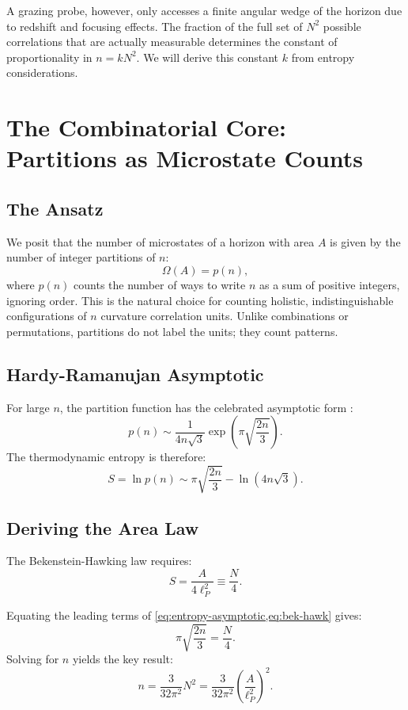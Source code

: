 \documentclass[12pt, letterpaper]{article}
\begin{document}
A grazing probe, however, only accesses a finite angular wedge of the horizon due to redshift and focusing effects. The fraction of the full set of $N^2$ possible correlations that are actually measurable determines the constant of proportionality in $n = k N^2$. We will derive this constant $k$ from entropy considerations.

\section{The Combinatorial Core: Partitions as Microstate Counts}
\label{sec:combinatorics}

\subsection{The Ansatz}
We posit that the number of microstates of a horizon with area $A$ is given by the number of integer partitions of $n$:
\[
\Omega(A) = p(n),
\]
where $p(n)$ counts the number of ways to write $n$ as a sum of positive integers, ignoring order. This is the natural choice for counting holistic, indistinguishable configurations of $n$ curvature correlation units. Unlike combinations or permutations, partitions do not label the units; they count patterns.

\subsection{Hardy-Ramanujan Asymptotic}
For large $n$, the partition function has the celebrated asymptotic form \cite{hardy1918}:
\begin{equation}
p(n) \sim \frac{1}{4n\sqrt{3}} \exp\left( \pi \sqrt{\frac{2n}{3}} \right).
\label{eq:hardy-ramanujan}
\end{equation}
The thermodynamic entropy is therefore:
\begin{equation}
S = \ln p(n) \sim \pi \sqrt{\frac{2n}{3}} - \ln(4n\sqrt{3}).
\label{eq:entropy-asymptotic}
\end{equation}

\subsection{Deriving the Area Law}
The Bekenstein-Hawking law requires:
\begin{equation}
S = \frac{A}{4\ell_P^2} \equiv \frac{N}{4}.
\label{eq:bek-hawk}
\end{equation}

Equating the leading terms of \cref{eq:entropy-asymptotic,eq:bek-hawk} gives:
\[
\pi \sqrt{\frac{2n}{3}} = \frac{N}{4}.
\]
Solving for $n$ yields the key result:
\begin{equation}
n = \frac{3}{32\pi^2} N^2 = \frac{3}{32\pi^2} \left( \frac{A}{\ell_P^2} \right)^2.
\label{eq:n-scaling}
\end{equation}
\end{document}

